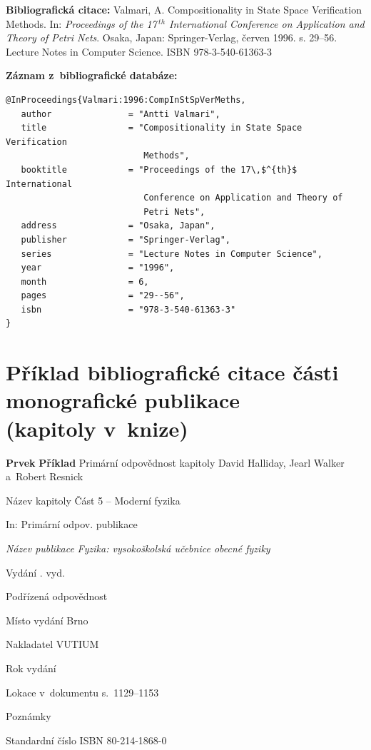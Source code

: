 \noindent \textbf{Bibliografická citace:} \odradkovani
{\sc Valmari}, A. Compositionality in State Space Verification Methods.
In: {\em Proceedings of the 17\,$^{th}$ International Conference on Application and
Theory of Petri Nets}. Osaka, Japan: Springer-Verlag, červen 1996. s. 29--56. Lecture Notes in Computer Science. ISBN 978-3-540-61363-3

\bigskip \bigskip
\noindent \textbf{Záznam z~bibliografické databáze:}
\vspace{-0.5em}
\begin{verbatim}
@InProceedings{Valmari:1996:CompInStSpVerMeths,
   author               = "Antti Valmari",
   title                = "Compositionality in State Space Verification
                           Methods",
   booktitle            = "Proceedings of the 17\,$^{th}$ International
                           Conference on Application and Theory of
                           Petri Nets",
   address              = "Osaka, Japan",
   publisher            = "Springer-Verlag",
   series               = "Lecture Notes in Computer Science",
   year                 = "1996",
   month                = 6,
   pages                = "29--56",
   isbn                 = "978-3-540-61363-3"
}
\end{verbatim}


\newpage
\section*{Příklad bibliografické citace části monografické publikace \\
(kapitoly v~knize)}
\label{pr-kapitola-monografie}
\begin{tabbing} 
\zarazky
\textbf{Prvek} \> \textbf{Příklad} \odradkovani
Primární odpovědnost kapitoly \>
David {\sc Halliday}, Jearl {\sc Walker} a~Robert {\sc Resnick}

\odradkovani
Název kapitoly \>
Část 5 -- Moderní fyzika

\odradkovani
In: Primární odpov. publikace\footnotemark[1]

\odradkovani
{\em Název publikace} \>
{\em Fyzika: vysokoškolská učebnice obecné fyziky}

\odradkovani
Vydání . vyd.

\odradkovani
Podřízená odpovědnost\footnotemark[2] \>

\odradkovani
Místo vydání \>
Brno

\odradkovani
Nakladatel \>
VUTIUM

\odradkovani
Rok vydání 

\odradkovani
Lokace v~dokumentu \>
s.~1129--1153

\odradkovani
Poznámky\footnotemark[3] \>

\odradkovani
Standardní číslo \>
ISBN 80-214-1868-0

\odradkovani
\end{tabbing}

